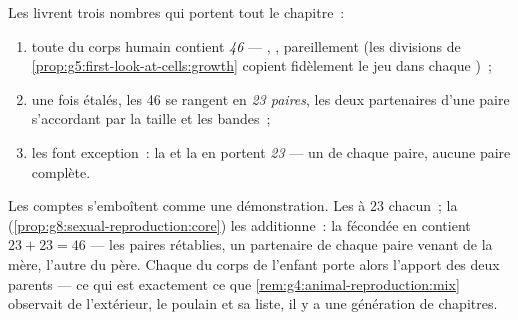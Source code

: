 \begin{proposition}\label{prop:g9:chromosomes:counts}
Les  livrent trois nombres qui portent tout le
chapitre~:
\begin{enumerate}
  \item toute  du corps humain contient \emph{46}
         --- , ,  pareillement
        (les divisions de
        \cref{prop:g5:first-look-at-cells:growth} copient
        fidèlement le jeu dans chaque )~;
  \item une fois étalés, les 46 se rangent en
        \emph{23 paires}, les deux partenaires d'une paire
        s'accordant par la taille et les bandes~;
  \item les \emph{} font exception~: la 
        et la  en portent \emph{23} --- un
         de chaque paire, aucune paire complète.
\end{enumerate}
\end{proposition}
\admitted

\begin{example}\label{ex:g9:chromosomes:arithmetic}
Les comptes s'emboîtent comme une démonstration. Les
 à 23 chacun~; la 
(\cref{prop:g8:sexual-reproduction:core}) les additionne~:
la  fécondée en contient $23 + 23 = 46$ --- les
paires rétablies, un partenaire de chaque paire venant de
la mère, l'autre du père. Chaque  du corps de
l'enfant porte alors l'apport des deux parents --- ce qui
est exactement ce que \cref{rem:g4:animal-reproduction:mix}
observait de l'extérieur, le poulain et sa liste, il y a une
génération de chapitres.
\end{example}

